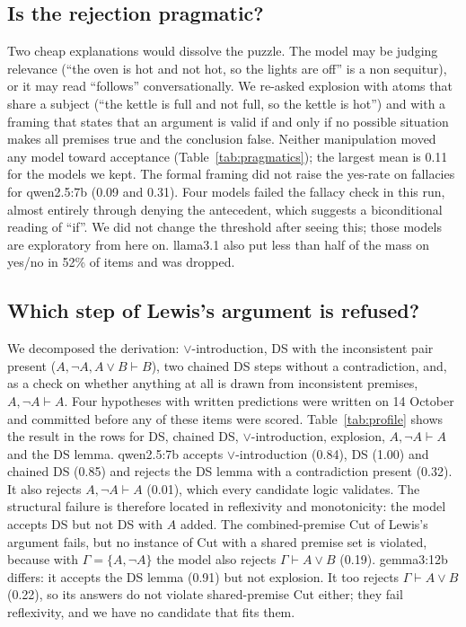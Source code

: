 \documentclass[11pt]{article}
\begin{document}
\subsection{Is the rejection pragmatic?}\label{sec:pragmatics}
Two cheap explanations would dissolve the puzzle. The model may be judging relevance (``the oven is hot
and not hot, so the lights are off'' is a non sequitur), or it may read ``follows'' conversationally. We
re-asked explosion with atoms that share a subject (``the kettle is full and not full, so the kettle is
hot'') and with a framing that states that an argument is valid if and only if no possible situation makes
all premises true and the conclusion false. Neither manipulation moved any model toward acceptance
(Table~\ref{tab:pragmatics}); the largest mean is 0.11 for the models we kept. The formal framing did not
raise the yes-rate on fallacies for qwen2.5:7b (0.09 and 0.31). Four models failed the fallacy check in
this run, almost entirely through denying the antecedent, which suggests a biconditional reading of
``if''. We did not change the threshold after seeing this; those models are exploratory from here on.
llama3.1 also put less than half of the mass on yes/no in 52\% of items and was dropped.

\subsection{Which step of Lewis's argument is refused?}\label{sec:chain}
We decomposed the derivation: $\lor$-introduction, DS with the inconsistent pair present
($A, \neg A, A\lor B \vdash B$), two chained DS steps without a contradiction, and, as a check on whether
anything at all is drawn from inconsistent premises, $A, \neg A \vdash A$. Four hypotheses with written
predictions were written on 14 October and committed before any of these items were scored.
Table~\ref{tab:profile} shows the result in the rows for DS, chained DS, $\lor$-introduction, explosion,
$A, \neg A \vdash A$ and the DS lemma. qwen2.5:7b accepts $\lor$-introduction (0.84), DS (1.00) and
chained DS (0.85) and rejects the DS lemma with a contradiction present (0.32). It also rejects
$A, \neg A \vdash A$ (0.01), which every candidate logic validates. The structural failure is therefore
located in reflexivity and monotonicity: the model accepts DS but not DS with $A$ added. The combined-premise
Cut of Lewis's argument fails, but no instance of Cut with a shared premise set is violated, because with
$\Gamma = \{A, \neg A\}$ the model also rejects $\Gamma \vdash A \lor B$ (0.19). gemma3:12b differs: it
accepts the DS lemma (0.91) but not explosion. It too rejects $\Gamma \vdash A \lor B$ (0.22), so its
answers do not violate shared-premise Cut either; they fail reflexivity, and we have no candidate that
fits them.
\end{document}
